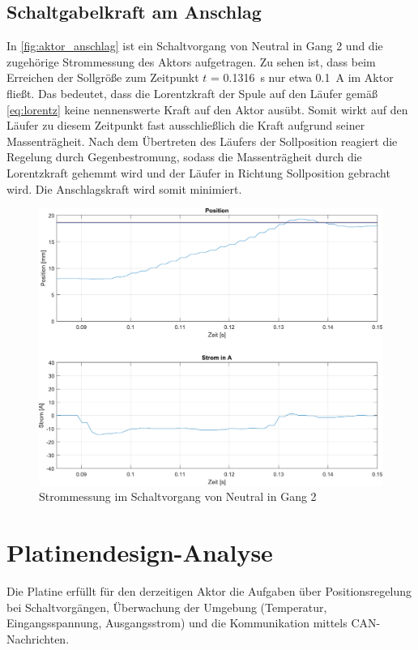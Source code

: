 \subsection{Schaltgabelkraft am Anschlag}\label{schaltgabelkraft}
In \autoref{fig:aktor_anschlag} ist ein Schaltvorgang von Neutral in Gang 2 und die zugehörige Strommessung des Aktors aufgetragen. Zu sehen ist, dass beim Erreichen der Sollgröße zum Zeitpunkt $t$ = \SI{0,1316}{s} nur etwa \SI{0,1}{A} im Aktor fließt. Das bedeutet, dass die Lorentzkraft der Spule auf den Läufer gemäß \autoref{eq:lorentz} keine nennenswerte Kraft auf den Aktor ausübt. Somit wirkt auf den Läufer zu diesem Zeitpunkt fast ausschließlich die Kraft aufgrund seiner Massenträgheit. Nach dem Übertreten des Läufers der Sollposition reagiert die Regelung durch Gegenbestromung, sodass die Massenträgheit durch die Lorentzkraft gehemmt wird und der Läufer in Richtung Sollposition gebracht wird. Die Anschlagskraft wird somit minimiert.

\begin{figure} [h]
	\centering
	\includegraphics[width=1\linewidth]{Bilder/aktor_anschlag2}
	\caption{Strommessung im Schaltvorgang von Neutral in Gang 2}
	\label{fig:aktor_anschlag}
\end{figure}

\section{Platinendesign-Analyse}
Die Platine erfüllt für den derzeitigen Aktor die Aufgaben über Positionsregelung bei Schaltvorgängen, Überwachung der Umgebung (Temperatur, Eingangsspannung, Ausgangsstrom) und die Kommunikation mittels CAN-Nachrichten.

